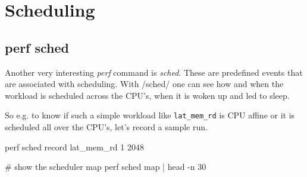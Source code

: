 \chapter{Scheduling}
\section{perf sched}

Another very interesting {\em perf} command is {\em sched}. These are predefined events
that are associated with scheduling. With /sched/ one can see how and when the
workload is scheduled across the CPU's, when it is woken up and led to sleep.

So e.g. to know if such a simple workload like {\tt lat_mem_rd} is CPU affine or it is
scheduled all over the CPU's, let's record a sample run.

\starttyping
perf sched record lat_mem_rd 1 2048
\stoptyping

\starttyping
# show the scheduler map
perf sched map | head -n 30

